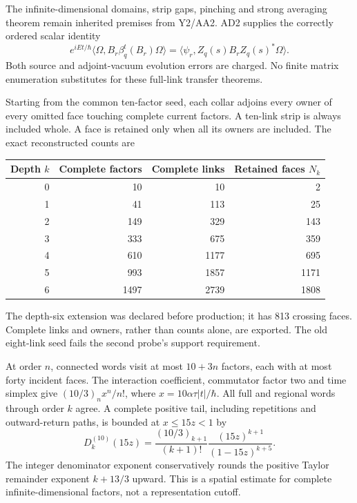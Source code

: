 The infinite-dimensional domains, strip gaps, pinching and strong averaging theorem remain inherited premises from Y2/AA2. AD2 supplies the correctly ordered scalar identity
\begin{equation}
 e^{iEt/\hbar}\langle\Omega,B_r\beta_q^t(B_r)\Omega\rangle
 =\langle\psi_r,Z_q(s)B_r Z_q(s)^*\Omega\rangle.
 \label{eq:ai3-ordered-transfer}
\end{equation}
Both source and adjoint-vacuum evolution errors are charged. No finite matrix enumeration substitutes for these full-link transfer theorems.

Starting from the common ten-factor seed, each collar adjoins every owner of every omitted face touching complete current factors. A ten-link strip is always included whole. A face is retained only when all its owners are included. The exact reconstructed counts are
\begin{center}\small
\begin{tabular}{@{}rrrr@{}}\toprule
Depth $k$ & Complete factors & Complete links & Retained faces $N_k$\\\midrule
0&10&10&2\\1&41&113&25\\2&149&329&143\\
3&333&675&359\\4&610&1177&695\\5&993&1857&1171\\
6&1497&2739&1808\\\bottomrule
\end{tabular}
\end{center}
The depth-six extension was declared before production; it has 813 crossing faces. Complete links and owners, rather than counts alone, are exported. The old eight-link seed fails the second probe's support requirement.

At order $n$, connected words visit at most $10+3n$ factors, each with at most forty incident faces. The interaction coefficient, commutator factor two and time simplex give $(10/3)_n x^n/n!$, where $x=10\alpha\tau|t|/\hbar$. All full and regional words through order $k$ agree. A complete positive tail, including repetitions and outward-return paths, is bounded at $x\le15z<1$ by
\begin{equation}
 D_k^{(10)}(15z)=\frac{(10/3)_{k+1}}{(k+1)!}
 \frac{(15z)^{k+1}}{(1-15z)^{k+5}}.
 \label{eq:ai3-collar-tail}
\end{equation}
The integer denominator exponent conservatively rounds the positive Taylor remainder exponent $k+13/3$ upward. This is a spatial estimate for complete infinite-dimensional factors, not a representation cutoff.

